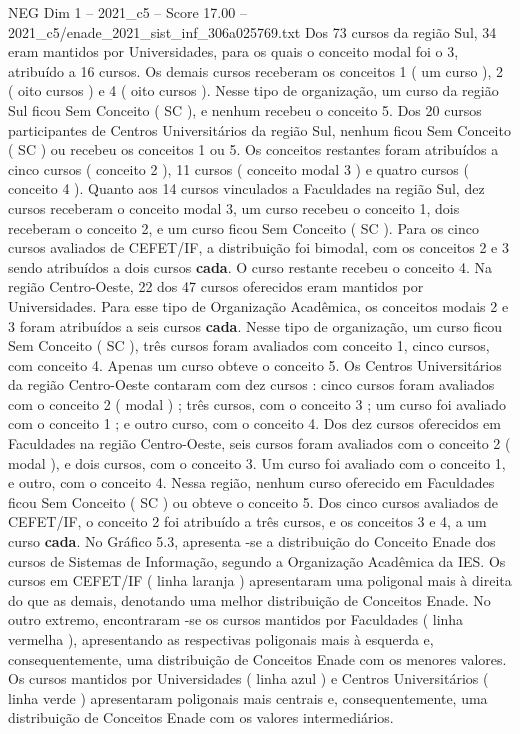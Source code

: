 \begin{textsample}{NEG Dim 1 – 2021\_c5 – Score 17.00 – 2021\_c5/enade\_2021\_sist\_inf\_306a025769.txt}
Dos 73 cursos da região Sul, 34 eram mantidos por Universidades, para os quais o conceito modal foi o 3, atribuído a 16 cursos.
Os demais cursos receberam os conceitos 1 ( um curso ), 2 ( oito cursos ) e 4 ( oito cursos ).
Nesse tipo de organização, um curso da região Sul ficou Sem Conceito ( SC ), e nenhum recebeu o conceito 5.
Dos 20 cursos participantes de Centros Universitários da região Sul, nenhum ficou Sem Conceito ( SC ) ou recebeu os conceitos 1 ou 5.
Os conceitos restantes foram atribuídos a cinco cursos ( conceito 2 ), 11 cursos ( conceito modal 3 ) e quatro cursos ( conceito 4 ).
Quanto aos 14 cursos vinculados a Faculdades na região Sul, dez cursos receberam o conceito modal 3, um curso recebeu o conceito 1, dois receberam o conceito 2, e um curso ficou Sem Conceito ( SC ).
Para os cinco cursos avaliados de CEFET/IF, a distribuição foi bimodal, com os conceitos 2 e 3 sendo atribuídos a dois cursos \textbf{cada}.
O curso restante recebeu o conceito 4.
Na região Centro-Oeste, 22 dos 47 cursos oferecidos eram mantidos por Universidades.
Para esse tipo de Organização Acadêmica, os conceitos modais 2 e 3 foram atribuídos a seis cursos \textbf{cada}.
Nesse tipo de organização, um curso ficou Sem Conceito ( SC ), três cursos foram avaliados com conceito 1, cinco cursos, com conceito 4.
Apenas um curso obteve o conceito 5.
Os Centros Universitários da região Centro-Oeste contaram com dez cursos : cinco cursos foram avaliados com o conceito 2 ( modal ) ; três cursos, com o conceito 3 ; um curso foi avaliado com o conceito 1 ; e outro curso, com o conceito 4.
Dos dez cursos oferecidos em Faculdades na região Centro-Oeste, seis cursos foram avaliados com o conceito 2 ( modal ), e dois cursos, com o conceito 3.
Um curso foi avaliado com o conceito 1, e outro, com o conceito 4.
Nessa região, nenhum curso oferecido em Faculdades ficou Sem Conceito ( SC ) ou obteve o conceito 5.
Dos cinco cursos avaliados de CEFET/IF, o conceito 2 foi atribuído a três cursos, e os conceitos 3 e 4, a um curso \textbf{cada}.
No Gráfico 5.3, apresenta -se a distribuição do Conceito Enade dos cursos de Sistemas de Informação, segundo a Organização Acadêmica da IES.
Os cursos em CEFET/IF ( linha laranja ) apresentaram uma poligonal mais à direita do que as demais, denotando uma melhor distribuição de Conceitos Enade.
No outro extremo, encontraram -se os cursos mantidos por Faculdades ( linha vermelha ), apresentando as respectivas poligonais mais à esquerda e, consequentemente, uma distribuição de Conceitos Enade com os menores valores.
Os cursos mantidos por Universidades ( linha azul ) e Centros Universitários ( linha verde ) apresentaram poligonais mais centrais e, consequentemente, uma distribuição de Conceitos Enade com os valores intermediários.

\end{textsample}
